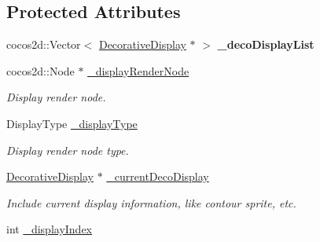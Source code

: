 \subsection*{Protected Attributes}
\begin{DoxyCompactItemize}
\item 
\mbox{\label{classcocostudio_1_1DisplayManager_a959e57daea1d1e0411cf637193947b23}} 
cocos2d\+::\+Vector$<$ \hyperlink{classcocostudio_1_1DecorativeDisplay}{Decorative\+Display} $\ast$ $>$ {\bfseries \+\_\+deco\+Display\+List}
\item 
\mbox{\label{classcocostudio_1_1DisplayManager_a8ae176f7a533c6884fa1b1431a67ef38}} 
cocos2d\+::\+Node $\ast$ \hyperlink{classcocostudio_1_1DisplayManager_a8ae176f7a533c6884fa1b1431a67ef38}{\+\_\+display\+Render\+Node}
\begin{DoxyCompactList}\small\item\em Display render node. \end{DoxyCompactList}\item 
\mbox{\label{classcocostudio_1_1DisplayManager_a4f2b4d1ed6971de8f613ebcccde5b834}} 
Display\+Type \hyperlink{classcocostudio_1_1DisplayManager_a4f2b4d1ed6971de8f613ebcccde5b834}{\+\_\+display\+Type}
\begin{DoxyCompactList}\small\item\em Display render node type. \end{DoxyCompactList}\item 
\mbox{\label{classcocostudio_1_1DisplayManager_ac9a2f8e00ecbf44ef0fe639b5598128f}} 
\hyperlink{classcocostudio_1_1DecorativeDisplay}{Decorative\+Display} $\ast$ \hyperlink{classcocostudio_1_1DisplayManager_ac9a2f8e00ecbf44ef0fe639b5598128f}{\+\_\+current\+Deco\+Display}
\begin{DoxyCompactList}\small\item\em Include current display information, like contour sprite, etc. \end{DoxyCompactList}\item 
\mbox{\label{classcocostudio_1_1DisplayManager_a28add5b02bed1913bdd9c5281ec2e3e3}} 
int \hyperlink{classcocostudio_1_1DisplayManager_a28add5b02bed1913bdd9c5281ec2e3e3}{\+\_\+display\+Index}

\end{DoxyCompactItemize}
